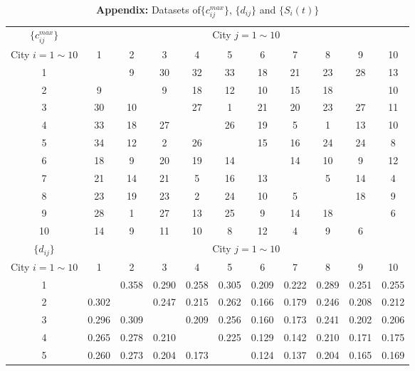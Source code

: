 \documentclass[11pt,twocolumn]{article}
\begin{document}
\begin{table*}[h]
    \centering
    \caption*{\textbf{Appendix:} Datasets of$\{c_{ij}^{max}\}$, $\{d_{ij}\}$ and $\{S_i(t)\}$}
    \label{table3}
    \footnotesize 
    \setlength{\tabcolsep}{8pt}
    \renewcommand{\arraystretch}{1.2}
\begin{tabular}{c|cccccccccc}
    \toprule
    $\{c_{ij}^{max}\}$ & \multicolumn{10}{c}{City $j=1\sim10$} \\
    City $i=1\sim10$ & 1 & 2 & 3 & 4 & 5 & 6 & 7 & 8 & 9 & 10 \\ \hline
    1  &      & 9    & 30   & 32   & 33   & 18   & 21   & 23   & 28   & 13   \\
    2  & 9    &      & 9    & 18   & 12   & 10   & 15   & 18   &      & 10   \\
    3  & 30   & 10   &      & 27   & 1    & 21   & 20   & 23   & 27   & 11   \\
    4  & 33   & 18   & 27   &      & 26   & 19   & 5    & 1    & 13   & 10   \\
    5  & 34   & 12   & 2    & 26   &      & 15   & 16   & 24   & 24   & 8    \\
    6  & 18   & 9    & 20   & 19   & 14   &      & 14   & 10   & 9    & 12   \\
    7  & 21   & 14   & 21   & 5    & 16   & 13   &      & 5    & 14   & 4    \\
    8  & 23   & 19   & 23   & 2    & 24   & 10   & 5    &      & 18   & 9    \\
    9  & 28   & 1    & 27   & 13   & 25   & 9    & 14   & 18   &      & 6    \\
    10 & 14   & 9    & 11   & 10   & 8    & 12   & 4    & 9    & 6    &      \\
    \toprule
    \toprule
    $\{d_{ij}\}$ & \multicolumn{10}{c}{City $j=1\sim10$} \\
    City $i=1\sim10$ & 1 & 2 & 3 & 4 & 5 & 6 & 7 & 8 & 9 & 10 \\ \hline
    1 &  & 0.358 & 0.290 & 0.258 & 0.305 & 0.209 & 0.222 & 0.289 & 0.251 & 0.255 \\ 
    2 & 0.302 &  & 0.247 & 0.215 & 0.262 & 0.166 & 0.179 & 0.246 & 0.208 & 0.212 \\ 
    3 & 0.296 & 0.309 &  & 0.209 & 0.256 & 0.160 & 0.173 & 0.241 & 0.202 & 0.206 \\ 
    4 & 0.265 & 0.278 & 0.210 &  & 0.225 & 0.129 & 0.142 & 0.210 & 0.171 & 0.175 \\ 
    5 & 0.260 & 0.273 & 0.204 & 0.173 &  & 0.124 & 0.137 & 0.204 & 0.165 & 0.169 \\ 

\end{tabular}
\end{table*}
\end{document}

